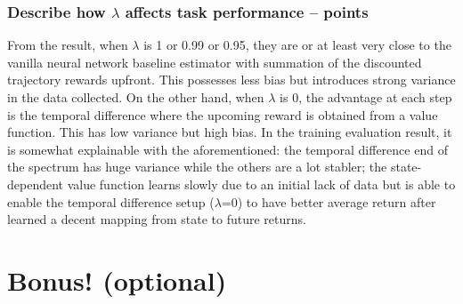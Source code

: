 \documentclass{article}
\begin{document}
\subsubsection{Describe how $\lambda$ affects task performance --  points\rbrack}
\begin{answer}[title=Q8.1.3,height=6cm,width=\linewidth]
From the result, when ${\lambda}$ is 1 or 0.99 or 0.95, they are or at least very close to the vanilla neural network baseline estimator with summation of the discounted trajectory rewards upfront. This possesses less bias but introduces strong variance in the data collected. On the other hand, when ${\lambda}$ is 0, the advantage at each step is the temporal difference where the upcoming reward is obtained from a value function. This has low variance but high bias. In the training evaluation result, it is somewhat explainable with the aforementioned: the temporal difference end of the spectrum has huge variance while the others are a lot stabler; the state-dependent value function learns slowly due to an initial lack of data but is able to enable the temporal difference setup (${\lambda}$=0) to have better average return after learned a decent mapping from state to future returns.
\end{answer}

\clearpage

\section{Bonus! (optional)}
\end{document}
